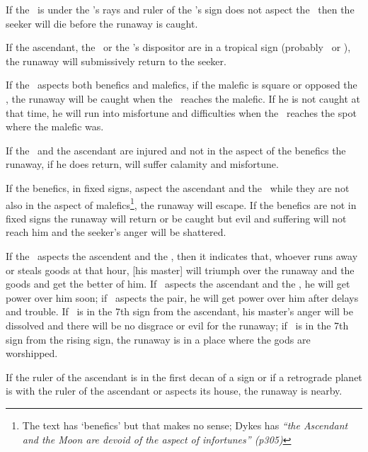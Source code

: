If the \Moon\, is under the \Sun's rays and ruler of the \Sun's sign does not aspect the \Moon\, then the seeker will die before the runaway is caught. 

If the ascendant, the \Moon\, or the \Moon's dispositor are in a tropical sign (probably \Cancer\, or \Capricorn), the runaway will submissively return to the seeker.

If the \Moon\, aspects both benefics and malefics, if the malefic is square or opposed the \Moon, the runaway will be caught when the \Moon\, reaches the malefic. If he is not caught at that time, he will run into misfortune and difficulties when the \Moon\, reaches the spot where the malefic was. 

If the \Moon\, and the ascendant are injured and not in the aspect of the benefics the runaway, if he does return, will suffer calamity and misfortune. 

If the benefics, in fixed signs, aspect the ascendant and the \Moon\, while they are not also in the aspect of malefics\footnote{The text has `benefics' but that makes no sense; Dykes has  \textsl{``the Ascendant and the Moon are devoid of the aspect of infortunes'' (p305)}}, the runaway will escape. If the benefics are not in fixed signs the runaway will return or be caught but evil and suffering will not reach him and the seeker's anger will be shattered.

If the \Sun\, aspects the ascendent and the \Moon, then it indicates that, whoever runs away or steals goods at that hour, [his master] will triumph over the runaway and the goods and get the better of him. If \Mars\, aspects the ascendant and the \Moon, he will get power over him soon; if \Saturn\, aspects the pair, he will get power over him after delays and trouble.  If \Jupiter\, is in the 7th sign from the ascendant, his master's anger will be dissolved and there will be no disgrace or evil for the runaway; if \Venus\, is in the 7th sign from the rising sign, the runaway is in a place where the gods are worshipped.

If the ruler of the ascendant is in the first decan of a sign or if a retrograde planet is with the ruler of the ascendant or aspects its house, the runaway is nearby. 

